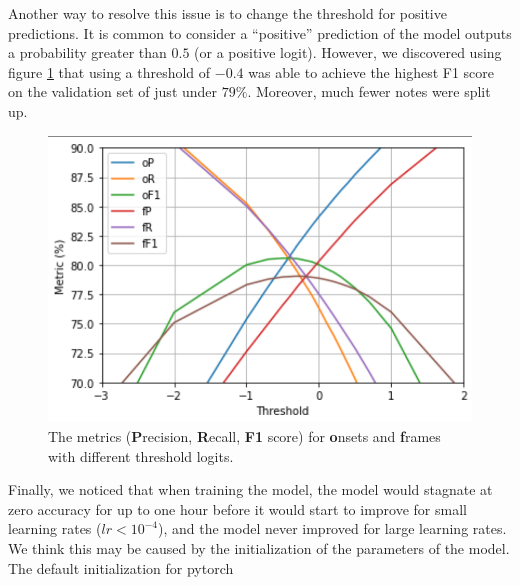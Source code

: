 \documentclass[a4paper,twocolumn,10pt]{article}
\begin{document}
Another way to resolve this issue is to change the threshold for positive predictions. It is common to consider a ``positive'' prediction of the model outputs a probability greater than \(0.5\) (or a positive logit). However, we discovered using figure \ref{fig:threshold} that using a threshold of \(-0.4\) was able to achieve the highest F1 score on the validation set of just under $79\%$. Moreover, much fewer notes were split up.

\begin{figure}[h!]
  \centering
  \includegraphics[width=\linewidth]{figures/threshold.png}
  \caption{The metrics (\textbf{P}recision, \textbf{R}ecall, \textbf{F1} score) for \textbf{o}nsets and \textbf{f}rames with different threshold logits.}
  \label{fig:threshold}
\end{figure}

Finally, we noticed that when training the model, the model would stagnate at zero accuracy for up to one hour before it would start to improve for small learning rates (\(lr<10^{-4}\)), and the model never improved for large learning rates. We think this may be caused by the initialization of the parameters of the model. The default initialization for pytorch  
\end{document}
